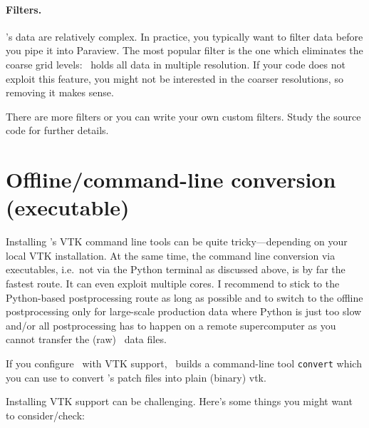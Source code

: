 \paragraph{Filters.}
%
%
%
\Peano's data are relatively complex.
In practice, you typically want to filter data before you pipe it into Paraview.
The most popular filter is the one which eliminates the coarse grid levels:
\Peano\ holds all data in multiple resolution.
If your code does not exploit this feature, you might not be interested in the 
coarser resolutions, so removing it makes sense.


There are more filters or you can write your own custom filters.
Study the source code for further details.


\section{Offline/command-line conversion (executable)}
\label{section:postprocessing:command-line}


Installing \Peano's VTK command line tools can be quite tricky---depending on your
local VTK installation.
At the same time, the command line conversion via executables, i.e.~not via the 
Python terminal as discussed above, is by far the fastest route.
It  can even exploit multiple cores.
I recommend to stick to the Python-based postprocessing route as long as possible 
and to switch to the offline postprocessing only for large-scale production data
where Python is just too slow and/or all postprocessing has to happen on a remote 
supercomputer as you cannot transfer the (raw) \Peano\ data files.


\begin{remark}
  If you configure \Peano\ with VTK support, \Peano\ builds a command-line tool
  \texttt{convert} which you can use to convert \Peano 's patch files into plain
  (binary) vtk.
\end{remark}



\noindent
Installing VTK support can be challenging. 
Here's some things you might want to consider/check:

